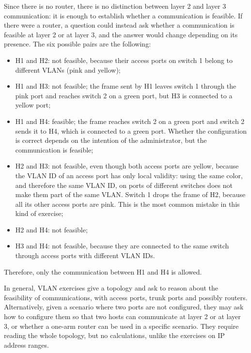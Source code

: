 Since there is no router, there is no distinction between layer 2 and layer 3 communication: it is enough to establish whether a communication is feasible. If there were a router, a question could instead ask whether a communication is feasible at layer 2 or at layer 3, and the answer would change depending on its presence. The six possible pairs are the following:
\begin{itemize}
	\item H1 and H2: not feasible, because their access ports on switch 1 belong to different VLANs (pink and yellow);
	\item H1 and H3: not feasible; the frame sent by H1 leaves switch 1 through the pink port and reaches switch 2 on a green port, but H3 is connected to a yellow port;
	\item H1 and H4: feasible; the frame reaches switch 2 on a green port and switch 2 sends it to H4, which is connected to a green port. Whether the configuration is correct depends on the intention of the administrator, but the communication is feasible;
	\item H2 and H3: not feasible, even though both access ports are yellow, because the VLAN ID of an access port has only local validity: using the same color, and therefore the same VLAN ID, on ports of different switches does not make them part of the same VLAN. Switch 1 drops the frame of H2, because all its other access ports are pink. This is the most common mistake in this kind of exercise;
	\item H2 and H4: not feasible;
	\item H3 and H4: not feasible, because they are connected to the same switch through access ports with different VLAN IDs.
\end{itemize}
Therefore, only the communication between H1 and H4 is allowed.

In general, VLAN exercises give a topology and ask to reason about the feasibility of communications, with access ports, trunk ports and possibly routers. Alternatively, given a scenario where two ports are not configured, they may ask how to configure them so that two hosts can communicate at layer 2 or at layer 3, or whether a one-arm router can be used in a specific scenario. They require reading the whole topology, but no calculations, unlike the exercises on IP address ranges.


